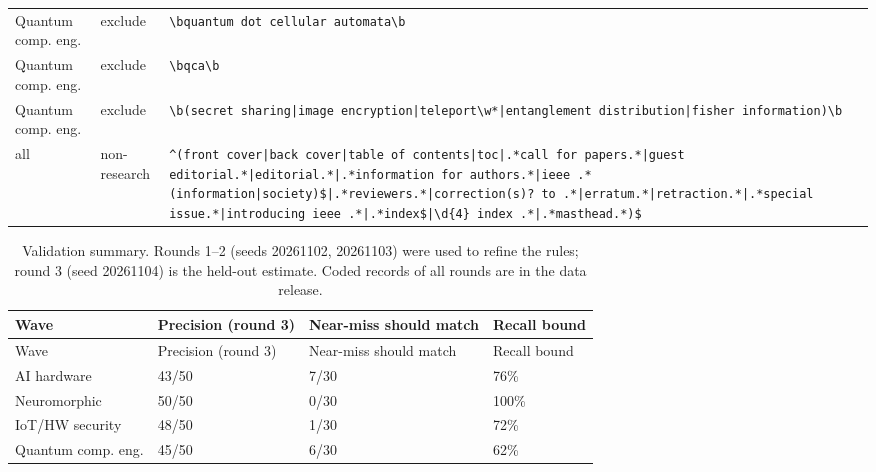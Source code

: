 \documentclass[10pt]{article}
\begin{document}
\begin{longtable}{@{}lL{1.6cm}L{11.5cm}@{}}
Quantum comp. eng. & exclude & \texttt{\textbackslash{}bquantum dot cellular automata\textbackslash{}b} \\
Quantum comp. eng. & exclude & \texttt{\textbackslash{}bqca\textbackslash{}b} \\
Quantum comp. eng. & exclude & \texttt{\textbackslash{}b\allowbreak(secret sharing\allowbreak|image encryption\allowbreak|teleport\textbackslash{}w*\allowbreak|entanglement distribution\allowbreak|fisher information)\textbackslash{}b} \\
all & non-research & \texttt{\textasciicircum{}\allowbreak(front cover\allowbreak|back cover\allowbreak|table of contents\allowbreak|toc\allowbreak|.*call for papers.*\allowbreak|guest editorial.*\allowbreak|editorial.*\allowbreak|.*information for authors.*\allowbreak|ieee .* \allowbreak(information\allowbreak|society)\$\allowbreak|.*reviewers.*\allowbreak|correction\allowbreak(s)? to .*\allowbreak|erratum.*\allowbreak|retraction.*\allowbreak|.*special issue.*\allowbreak|introducing ieee .*\allowbreak|.*index\$\allowbreak|\textbackslash{}d\{4\} index .*\allowbreak|.*masthead.*)\$} \\
\end{longtable}

\begin{longtable}{@{}llll@{}}
\caption{Validation summary. Rounds 1--2 (seeds 20261102, 20261103) were used to refine the rules; round 3 (seed 20261104) is the held-out estimate. Coded records of all rounds are in the data release.}\label{tab:S3}\\
\toprule
Wave & Precision (round 3) & Near-miss should match & Recall bound \\
\midrule
\endfirsthead
\toprule
Wave & Precision (round 3) & Near-miss should match & Recall bound \\
\midrule
\endhead
\bottomrule
\endlastfoot
AI hardware & 43/50 & 7/30 & 76\% \\
Neuromorphic & 50/50 & 0/30 & 100\% \\
IoT/HW security & 48/50 & 1/30 & 72\% \\
Quantum comp. eng. & 45/50 & 6/30 & 62\% \\
\end{longtable}

\addtocounter{table}{-1}
\end{document}
